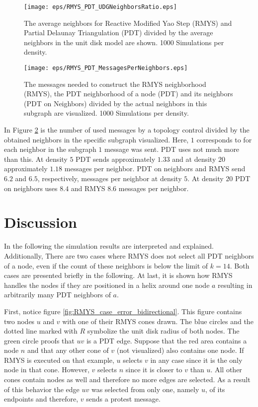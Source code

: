 \begin{figure}[h!]
\centering
\texttt{[image: eps/RMYS\_PDT\_UDGNeighborsRatio.eps]}
\caption{The average neighbors for Reactive Modified Yao Step (RMYS) and Partial Delaunay Triangulation (PDT) divided by the average neighbors in the unit disk model are shown. 1000 Simulations per density.}
\label{fig:RMYS_PDT_UDGNeighborsRatio}
\end{figure}

\begin{figure}[h!]
\centering
\texttt{[image: eps/RMYS\_PDT\_MessagesPerNeighbors.eps]}
\caption{The messages needed to construct the RMYS neighborhood (RMYS), the PDT neighborhood of a node (PDT) and its neighbors (PDT on Neighbors) divided by the actual neighbors in this subgraph are visualized. 1000 Simulations per density.}
\label{fig:RMYS_PDT_MessagesPerNeighbors}
\end{figure}

In Figure \ref{fig:RMYS_PDT_MessagesPerNeighbors} is the number of used messages by a topology control divided by the obtained neighbors in the specific subgraph visualized.
Here, $1 $ corresponds to for each neighbor in the subgraph $1 $ message was sent.
PDT uses not much more than this.
At density $5 $ PDT sends approximately $1.33$ and at density $20 $ approximately $1.18 $ messages per neighbor.
PDT on neighbors and RMYS send $6.2 $ and $6.5 $, respectively, messages per neighbor at density $5 $.
At density $20 $ PDT on neighbors uses $8.4 $ and RMYS $8.6 $ messages per neighbor.

\section{Discussion}
In the following the simulation results are interpreted and explained.
Additionally, 
There are two cases where RMYS does not select all PDT neighbors of a node, even if the count of these neighbors is below the limit of $k=14 $.
Both cases are presented briefly in the following.
At last, it is shown how RMYS handles the nodes if they are positioned in a helix around one node $a $ resulting in arbitrarily many PDT neighbors of $a $.

First, notice figure \ref{fig:RMYS_case_error_bidirectional}.
This figure contains two nodes $u $ and $v $ with one of their RMYS cones drawn.
The blue circles and the dotted line marked with $R $ symbolize the unit disk radius of both nodes.
The green circle proofs that $uv $ is a PDT edge.
Suppose that the red area contains a node $n $ and that any other cone of $v $ (not visualized) also contains one node.
If RMYS is executed on that example, $u $ selects $v $ in any case since it is the only node in that cone.
However, $v $ selects $n $ since it is closer to $v $ than $u $.
All other cones contain nodes as well and therefore no more edges are selected.
As a result of this behavior the edge $uv $ was selected from only one, namely $u $, of its endpoints and therefore, $v $ sends a protest message.

